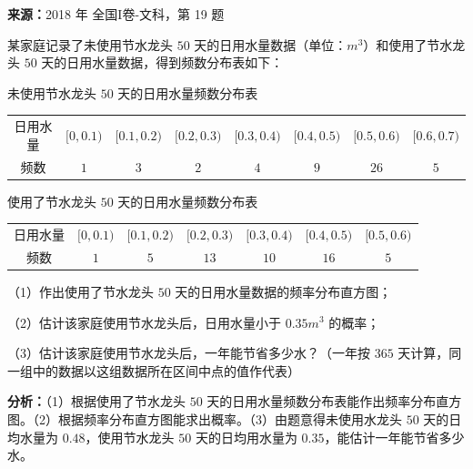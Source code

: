 \begin{question}[points=12]
\textbf{来源：}2018 年 全国I卷-文科，第 19 题\par
某家庭记录了未使用节水龙头 $50$ 天的日用水量数据（单位：$m^3$）和使用了节水龙头 $50$ 天的日用水量数据，得到频数分布表如下：

未使用节水龙头 $50$ 天的日用水量频数分布表



\begin{center}

\begin{tabular}{cccccccc}

日用水量 & $[0,0.1)$ & $[0.1,0.2)$ & $[0.2,0.3)$ & $[0.3,0.4)$ & $[0.4,0.5)$ & $[0.5,0.6)$ & $[0.6,0.7)$  \\

频数 & $1$ & $3$ & $2$ & $4$ & $9$ & $26$ & $5$

\end{tabular}

\end{center}

使用了节水龙头 $50$ 天的日用水量频数分布表



\begin{center}

\begin{tabular}{ccccccc}

日用水量 & $[0,0.1)$ & $[0.1,0.2)$ & $[0.2,0.3)$ & $[0.3,0.4)$ & $[0.4,0.5)$ & $[0.5,0.6)$  \\

频数 & $1$ & $5$ & $13$ & $10$ & $16$ & $5$

\end{tabular}

\end{center}

（1）作出使用了节水龙头 $50$ 天的日用水量数据的频率分布直方图；

（2）估计该家庭使用节水龙头后，日用水量小于 $0.35m^3$ 的概率；

（3）估计该家庭使用节水龙头后，一年能节省多少水？（一年按 $365$ 天计算，同一组中的数据以这组数据所在区间中点的值作代表）
\begin{solution}

\textbf{分析：}（1）根据使用了节水龙头 $50$ 天的日用水量频数分布表能作出频率分布直方图。（2）根据频率分布直方图能求出概率。（3）由题意得未使用水龙头 $50$ 天的日均水量为 $0.48$，使用节水龙头 $50$ 天的日均用水量为 $0.35$，能估计一年能节省多少水。


\end{solution}
\end{question}
